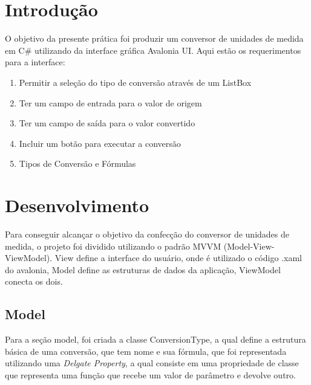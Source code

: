 \documentclass[
	12pt,				%
	oneside,			%
	a4paper,			%
	english,			%
	brazil,				%
	]{abntex2}
\begin{document}
\frenchspacing 

\imprimircapa

{
\ABNTEXchapterfont

\textual

\section{Introdução}

O objetivo da presente prática foi produzir um conversor de unidades de medida em C\# utilizando da interface gráfica Avalonia UI. Aqui estão os requerimentos para a interface:

\begin{enumerate}
    \item Permitir a seleção do tipo de conversão através de um ListBox
    \item Ter um campo de entrada para o valor de origem
    \item Ter um campo de saída para o valor convertido
    \item Incluir um botão para executar a conversão
    \item Tipos de Conversão e Fórmulas
\end{enumerate}

\section{Desenvolvimento}

Para conseguir alcançar o objetivo da confecção do conversor de unidades de medida, o projeto foi dividido utilizando o padrão MVVM (Model-View-ViewModel). View define a interface do usuário, onde é utilizado o código .xaml do avalonia, Model define as estruturas de dados da aplicação, ViewModel conecta os dois.

\subsection{Model}

Para a seção model, foi criada a classe ConversionType, a qual define a estrutura básica de uma conversão, que tem nome e sua fórmula, que foi representada utilizando uma \textit{Delgate Property}, a qual consiste em uma propriedade de classe que representa uma função que recebe um valor de parâmetro e devolve outro.

}
\end{document}
